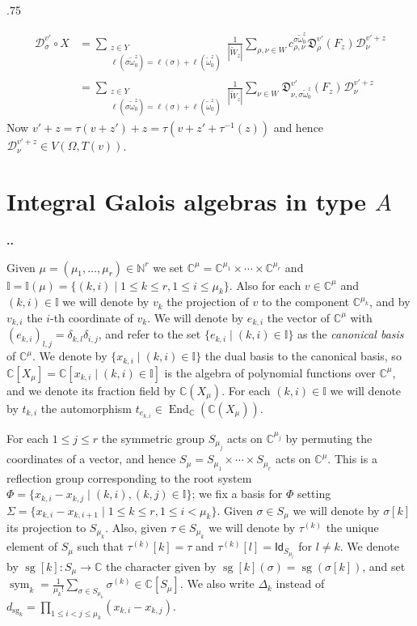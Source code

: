 \documentclass[11pt,fleqn]{amsart}
\makeatletter
\renewcommand\thesection{\arabic{section}}
\renewcommand\proofname{Proof}
\renewenvironment{proof}[1][\textit{\proofname}]{\par
 \pushQED{\qed}%
 \normalfont \topsep.75\paraskip\relax
 \trivlist
 \item[\hskip\labelsep
 \itshape
 #1\@addpunct{.}]\ignorespaces
}{%
 \popQED\endtrivlist\@endpefalse
}
\newcounter{para}[section]
\renewcommand\thepara{\thesection.\arabic{para}}
\def\paragraph{%
 \noindent
 \refstepcounter{para}%
 \textbf{\thepara.}\hspace{1ex}%
}
\newcommand\about[1]{%
 {\bfseries#1.}%
}
\newcommand\NN{\mathbb N}
\newcommand\CC{\mathbb C}
\newcommand\II{\mathbb I}
\renewcommand\to{\longrightarrow}
\newcommand\Id{\mathsf{Id}}
\newcommand\D[3]{{}^{#1} \mathfrak D_{#2}^{#3}}
\newcommand\DD[3]{{}^{#1} \mathcal D_{#2}^{#3}}
\DeclareMathOperator\End{End}
\DeclareMathOperator\sym{sym}
\DeclareMathOperator\sg{sg}
\makeatother
\begin{document}
\begin{proof}
\begin{align*}
\DD{}{\sigma}{v'} \circ X 
	&= \sum_{\substack{z \in Y \\ \ell(\sigma \widetilde \omega_0^z)
		= \ell(\sigma) + \ell(\widetilde \omega_0^z)}} \frac{1}{|\widetilde W_z|}
		\sum_{\rho, \nu \in W} 
			c^{\sigma \widetilde \omega_0^z}_{\rho, \nu}
				\D{}{\rho}{v'}(F_z) \DD{}{\nu}{v'+z} \\
	&= \sum_{\substack{z \in Y \\ \ell(\sigma \widetilde \omega_0^z)
		= \ell(\sigma) + \ell(\widetilde \omega_0^z)}} \frac{1}{|\widetilde W_z|}
		\sum_{\nu \in W} 
			\D{}{\nu, \sigma \widetilde \omega_0^z}{v'}(F_z) \DD{}{\nu}{v'+z}
\end{align*}
Now $v' + z = \tau(v+z') + z = \tau(v + z' + \tau^{-1}(z))$ and hence 
$\DD{}{\nu}{v'+z} \in V(\Omega, T(v))$.
\end{proof}

\section{Integral Galois algebras in type $A$}
\paragraph
Given $\mu = (\mu_1, \ldots, \mu_r) \in \NN^r$ we set $\CC^\mu = \CC^{\mu_1} 
\times \cdots \times \CC^{\mu_r}$ and $\II = \II(\mu) = \{(k,i) \mid 1 \leq k 
\leq r, 1 \leq i \leq \mu_k\}$. Also for each $v \in \CC^\mu$ and $(k,i) \in 
\II$ we will denote by $v_k$ the projection of $v$ to the component 
$\CC^{\mu_k}$, and by $v_{k,i}$ the $i$-th coordinate of $v_k$. We will denote 
by $e_{k,i}$ the vector of $\CC^\mu$ with $(e_{k,i})_{l,j} = \delta_{k,l}
\delta_{i,j}$, and refer to the set $\{e_{k,i} \mid (k,i) \in \II\}$ as the 
\emph{canonical basis} of $\CC^\mu$. We denote by $\{x_{k,i} \mid (k,i) \in 
\II\}$ the dual basis to the canonical basis, so $\CC[X_\mu] = \CC[x_{k,i} 
\mid (k,i) \in \II]$ is the algebra of polynomial functions over $\CC^\mu$, 
and we denote its fraction field by $\CC(X_\mu)$. For each $(k,i) \in \II$ we 
will denote by $t_{k,i}$ the automorphism $t_{e_{k,i}} \in 
\End_\CC(\CC(X_\mu))$.

For each $1 \leq j \leq r$ the symmetric group $S_{\mu_j}$ acts on 
$\CC^{\mu_j}$ by permuting the coordinates of a vector, and hence $S_\mu = 
S_{\mu_1} \times \cdots \times S_{\mu_r}$ acts on $\CC^\mu$. This is a 
reflection group corresponding to the root system $\Phi = \{x_{k,i} - x_{k,j} 
\mid (k,i),(k,j) \in \II\}$; we fix a basis for $\Phi$ setting $\Sigma = \{
x_{k,i} - x_{k,i+1} \mid 1 \leq k \leq r, 1 \leq i < \mu_k\}$.
Given $\sigma \in S_{\mu}$ we will denote by $\sigma[k]$ its projection to
$S_{\mu_k}$. Also, given $\tau \in S_{\mu_k}$ we will denote by $\tau^{(k)}$
the unique element of $S_\mu$ such that $\tau^{(k)}[k] = \tau$ and 
$\tau^{(k)}[l] = \Id_{S_{\mu_l}}$ for $l \neq k$. We denote by $\sg[k]: S_\mu
\to \CC$ the character given by $\sg[k](\sigma) = \sg(\sigma[k])$, and set
$\sym_k = \frac{1}{\mu_k!}\sum_{\sigma \in S_{\mu_k}} \sigma^{(k)} \in 
\CC[S_\mu]$. We also write $\Delta_k$ instead of $d_{\sg_k} = \prod_{1 \leq i 
< j \leq \mu_k} (x_{k,i} - x_{k,j})$.
\end{document}

